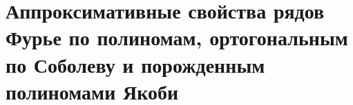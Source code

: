\chapter{Аппроксимативные свойства рядов Фурье по полиномам, ортогональным по Соболеву и порожденным полиномами Якоби}


